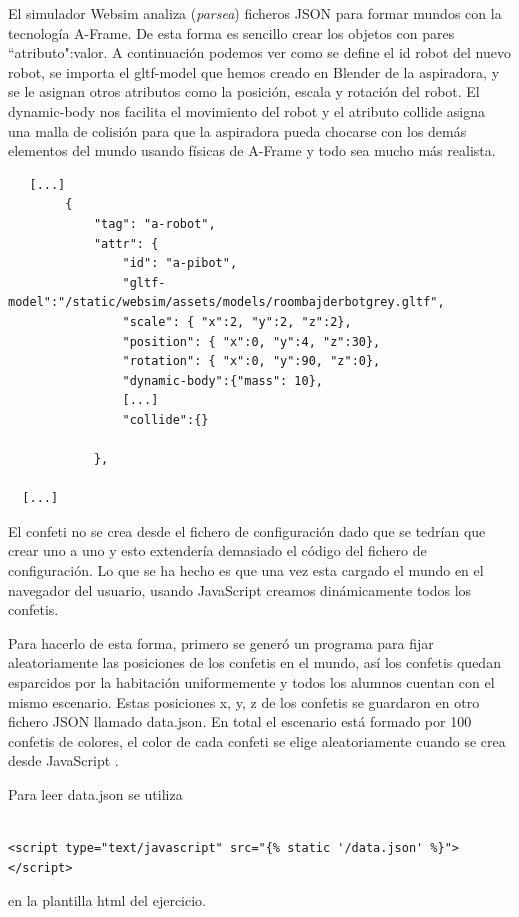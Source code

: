 El simulador Websim analiza (\textit{parsea}) ficheros JSON para formar mundos con la tecnología A-Frame. De esta forma es sencillo crear los objetos con pares ``atributo":valor. A continuación podemos ver como se define el id robot del nuevo robot, se importa el gltf-model que hemos creado en Blender de la aspiradora, y se le asignan otros atributos como la posición, escala y rotación del robot. El dynamic-body nos facilita el movimiento del robot y el atributo collide asigna una malla de colisión para que la aspiradora pueda chocarse con los demás elementos del mundo usando físicas de A-Frame y todo sea mucho más realista.

\begin{lstlisting}
   [...]
        {
            "tag": "a-robot",
            "attr": {
                "id": "a-pibot",
                "gltf-model":"/static/websim/assets/models/roombajderbotgrey.gltf",
                "scale": { "x":2, "y":2, "z":2},
                "position": { "x":0, "y":4, "z":30},
                "rotation": { "x":0, "y":90, "z":0},
                "dynamic-body":{"mass": 10},
                [...]
                "collide":{}

            },
           
  [...]
\end{lstlisting}

El confeti no se crea desde el fichero de configuración dado que se tedrían que crear uno a uno y esto extendería demasiado el código del fichero de configuración. Lo que se ha hecho es que una vez esta cargado el mundo en el navegador del usuario, usando JavaScript creamos dinámicamente todos los confetis.

Para hacerlo de esta forma, primero se generó un programa para fijar aleatoriamente las posiciones de los confetis en el mundo, así los confetis quedan esparcidos por la habitación uniformemente y todos los alumnos cuentan con el mismo escenario. Estas posiciones x, y, z de los confetis se guardaron en otro fichero JSON llamado data.json. En total el escenario está formado por 100 confetis de colores, el color de cada confeti se elige aleatoriamente cuando se crea  desde JavaScript .

Para leer data.json se utiliza
\begin{lstlisting}

<script type="text/javascript" src="{% static '/data.json' %}"></script>
\end{lstlisting}
en la plantilla html del ejercicio.

